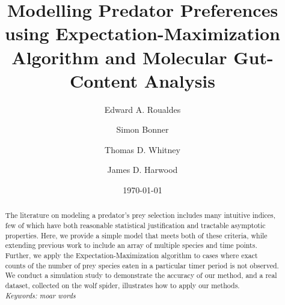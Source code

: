 \message{ !name(main.tex)}\documentclass[12pt,titlepage]{article}
\begin{document}

\maketitle

\begin{titlepage}
\title{Modelling Predator Preferences using Expectation-Maximization Algorithm and Molecular Gut-Content Analysis}
\author[1]{Edward A. Roualdes}
\author[1]{Simon Bonner}
\author[2]{Thomas D. Whitney}
\author[3]{James D. Harwood}

\date{\today}  



\end{titlepage}

\begin{abstract}
The literature on modeling a predator's prey selection includes many intuitive indices, few of which have both reasonable statistical justification and tractable asymptotic properties.  Here, we provide a simple model that meets both of these criteria, while extending previous work to include an array of multiple species and time points.  Further, we apply the Expectation-Maximization algorithm to cases where exact counts of the number of prey species eaten in a particular timer period is not observed.  We conduct a simulation study to demonstrate the accuracy of our method, and a real dataset, collected on the wolf spider, illustrates how to apply our methods. \\
\textit{Keywords: moar words}
\end{abstract}













\end{document}
